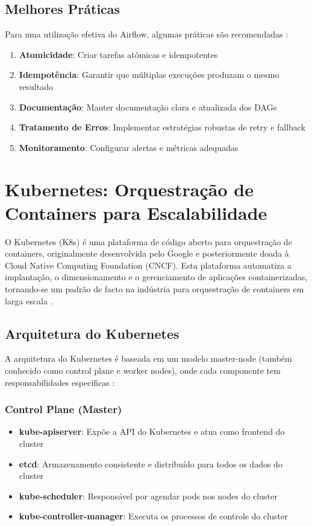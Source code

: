 \subsection{Melhores Práticas}

Para uma utilização efetiva do Airflow, algumas práticas são recomendadas \cite{airflow_practices}:

\begin{enumerate}
\item \textbf{Atomicidade}: Criar tarefas atômicas e idempotentes
\item \textbf{Idempotência}: Garantir que múltiplas execuções produzam o mesmo resultado
\item \textbf{Documentação}: Manter documentação clara e atualizada dos DAGs
\item \textbf{Tratamento de Erros}: Implementar estratégias robustas de retry e fallback
\item \textbf{Monitoramento}: Configurar alertas e métricas adequadas
\end{enumerate}



\section{Kubernetes: Orquestração de Containers para Escalabilidade}

O Kubernetes (K8s) é uma plataforma de código aberto para orquestração de containers, originalmente desenvolvida pelo Google e posteriormente doada à Cloud Native Computing Foundation (CNCF). Esta plataforma automatiza a implantação, o dimensionamento e o gerenciamento de aplicações containerizadas, tornando-se um padrão de facto na indústria para orquestração de containers em larga escala \cite{burns2019kubernetes}.

\subsection{Arquitetura do Kubernetes}

A arquitetura do Kubernetes é baseada em um modelo master-node (também conhecido como control plane e worker nodes), onde cada componente tem responsabilidades específicas \cite{kubernetes_arch}:

\subsubsection{Control Plane (Master)}
\begin{itemize}
\item \textbf{kube-apiserver}: Expõe a API do Kubernetes e atua como frontend do cluster
\item \textbf{etcd}: Armazenamento consistente e distribuído para todos os dados do cluster
\item \textbf{kube-scheduler}: Responsável por agendar pods nos nodes do cluster
\item \textbf{kube-controller-manager}: Executa os processos de controle do cluster
\end{itemize}

